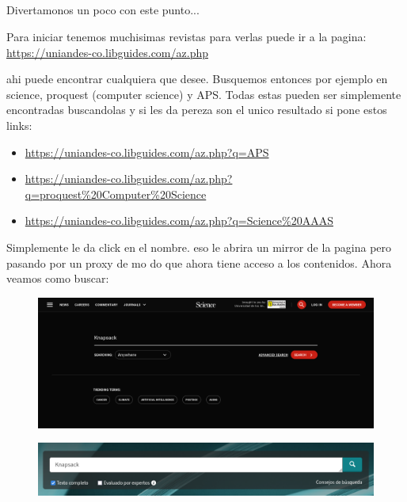 \documentclass[12pt]{exam}
\begin{document}
\subsection{}

Divertamonos un poco con este punto...

Para iniciar tenemos muchisimas revistas para verlas puede ir a la pagina: \url{https://uniandes-co.libguides.com/az.php}

ahi puede encontrar cualquiera que desee. Busquemos entonces por ejemplo en science, proquest (computer science) y APS. Todas estas pueden ser simplemente encontradas buscandolas y si les da pereza son el unico resultado si pone estos links:
\begin{itemize}
    \item \url{https://uniandes-co.libguides.com/az.php?q=APS}
    \item \url{https://uniandes-co.libguides.com/az.php?q=proquest%20Computer%20Science}
    \item \url{https://uniandes-co.libguides.com/az.php?q=Science%20AAAS}
\end{itemize}

Simplemente le da click en el nombre. eso le abrira un mirror de la pagina pero pasando por un proxy de mo do que ahora tiene acceso a los contenidos. Ahora veamos como buscar:

\begin{figure}[H]
    \centering
    \includegraphics[width=0.8\linewidth]{Figures/section_2_b_p1.png}
    \label{fig:sec_2_b_p1}
\end{figure}

\begin{figure}[H]
    \centering
    \includegraphics[width=0.8\linewidth]{Figures/section_2_b_p2.png}
    \label{fig:sec_2_b_p2}
\end{figure}
\end{document}
